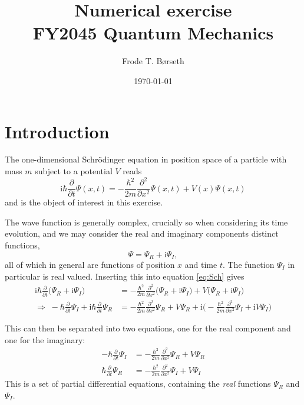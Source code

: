 \documentclass[10pt,a4paper]{article}
\author{Frode T. Børseth}
\date{\today}
\title{Numerical exercise\\FY2045 Quantum Mechanics}
\begin{document}
\maketitle

\section{Introduction}
The one-dimensional Schr\"odinger equation in position space of a particle with mass $m$ subject to a potential $V$ reads
\begin{equation}
	\mathrm{i} \hbar \frac{\partial}{\partial t}
	\Psi ( x, t)
	=
	- \frac{\hbar^2}{2m} \frac{\partial^2}{\partial x^2}
	\Psi (x, t)
	+
	V(x)
	\Psi (x, t) \label{eq:Sch}
\end{equation}
and is the object of interest in this exercise.

The wave function is generally complex, crucially so when considering its time evolution, and we may consider the real and imaginary components distinct functions,
\begin{equation}
	\Psi = \Psi_R + \mathrm{i} \Psi_I,
\end{equation}
all of which in general are functions of position $x$ and time $t$. The function $\Psi_I$ in particular is real valued. Inserting this into equation \ref{eq:Sch} gives
\begin{align*}
	\mathrm{i} \hbar \frac{\partial}{\partial t}
	\Big(
	\Psi_R + \mathrm{i}\Psi_I
	\Big)
	&=
	- \frac{\hbar^2}{2m} \frac{\partial^2}{\partial x^2}
	\Big(
	\Psi_R + \mathrm{i}\Psi_I
	\Big)
	+
	V
	\Big(
	\Psi_R + \mathrm{i}\Psi_I
	\Big)\\
	\Rightarrow \;
	- \hbar \frac{\partial}{\partial t}
	\Psi_I
	+
	\mathrm{i} \hbar \frac{\partial}{\partial t}
	\Psi_R
	&=
	- \frac{\hbar^2}{2m} \frac{\partial^2}{\partial x^2}
	\Psi_R
	+
	V\Psi_R 
	+
	\mathrm{i}
	\Big(
	-
	\frac{\hbar^2}{2m} \frac{\partial^2}{\partial x^2}
	\Psi_I
	+ 
	\mathrm{i}
	V\Psi_I
	\Big)
\end{align*}

This can then be separated into two equations, one for the real component and one for the imaginary:
\begin{align}
	- \hbar \frac{\partial}{\partial t} \Psi_I
	&=
	- \frac{\hbar^2}{2m} \frac{\partial^2}{\partial x^2}
	\Psi_R
	+
	V
	\Psi_R\\
	\hbar \frac{\partial}{\partial t} \Psi_R
	&=
	- \frac{\hbar^2}{2m} \frac{\partial^2}{\partial x^2}
	\Psi_I
	+
	V
	\Psi_I
\end{align}
This is a set of partial differential equations, containing the \emph{real} functions $\Psi_R$ and $\Psi_I$.
\end{document}
